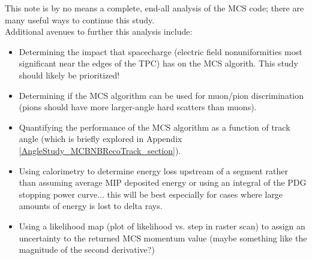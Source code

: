 This note is by no means a complete, end-all analysis of the MCS code; there are many useful ways to continue this study.\\

Additional avenues to further this analysis include:
\begin{itemize}
	\item Determining the impact that spacecharge (electric field nonuniformities most significant near the edges of the TPC) has on the MCS algorith. This study should likely be prioritized!
	\item Determining if the MCS algorithm can be used for muon/pion discrimination (pions should have more larger-angle hard scatters than muons).
	\item Quantifying the performance of the MCS algorithm as a function of track angle (which is briefly explored in Appendix \ref{AngleStudy_MCBNBRecoTrack_section}).
	\item Using calorimetry to determine energy loss upstream of a segment rather than assuming average MIP deposited energy or using an integral of the PDG stopping power curve... this will be best especially for cases where large amounts of energy is lost to delta rays.
	\item Using a likelihood map (plot of likelihood vs. step in raster scan) to assign an uncertainty to the returned MCS momentum value (maybe something like the magnitude of the second derivative?)
\end{itemize}


